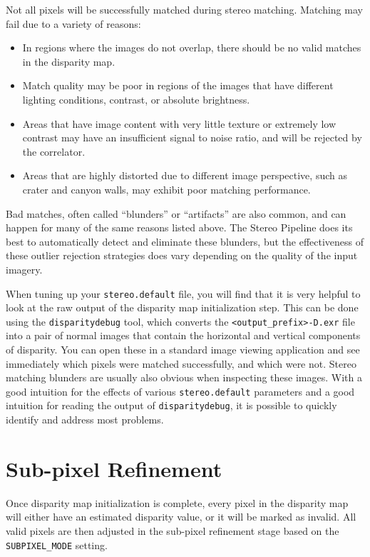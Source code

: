 Not all pixels will be successfully matched during stereo matching.
Matching may fail due to a variety of reasons:

\begin{itemize}
\item In regions where the images do not overlap, there should be no
  valid matches in the disparity map.
\item Match quality may be poor in regions of the images that have
  different lighting conditions, contrast, or absolute brightness.  
\item Areas that have image content with very little texture or
  extremely low contrast may have an insufficient signal to noise
  ratio, and will be rejected by the correlator.
\item Areas that are highly distorted due to different image
  perspective, such as crater and canyon walls, may exhibit poor
  matching performance.
\end{itemize}

Bad matches, often called ``blunders'' or ``artifacts'' are also
common, and can happen for many of the same reasons listed above.  The
Stereo Pipeline does its best to automatically detect and eliminate
these blunders, but the effectiveness of these outlier rejection
strategies does vary depending on the quality of the input imagery.

When tuning up your {\tt stereo.default} file, you will find that it
is very helpful to look at the raw output of the disparity map
initialization step.  This can be done using the {\tt disparitydebug}
tool, which converts the {\tt <output\_prefix>-D.exr} file into a pair
of normal images that contain the horizontal and vertical components
of disparity.  You can open these in a standard image viewing
application and see immediately which pixels were matched
successfully, and which were not.  Stereo matching blunders are
usually also obvious when inspecting these images.  With a good
intuition for the effects of various {\tt stereo.default} parameters
and a good intuition for reading the output of {\tt disparitydebug},
it is possible to quickly identify and address most problems.

\section{Sub-pixel Refinement}
\label{sec:subpixel}

Once disparity map initialization is complete, every pixel in the
disparity map will either have an estimated disparity value, or it
will be marked as invalid.  All valid pixels are then adjusted in the
sub-pixel refinement stage based on the \texttt{SUBPIXEL\_MODE} setting.

